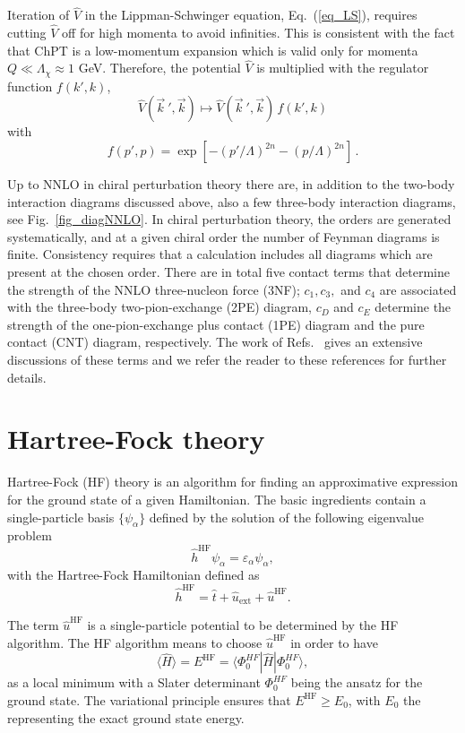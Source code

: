 Iteration of $\widehat V$ in the Lippman-Schwinger equation, Eq.~(\ref{eq_LS}),
requires cutting $\widehat V$ off for high momenta to avoid
infinities.  This is consistent with the fact that ChPT is a
low-momentum expansion which is valid only for momenta $Q \ll
\Lambda_\chi \approx 1$ GeV.  Therefore, the potential $\widehat V$ is
multiplied with the regulator function $f(k',k)$,
\begin{equation}
{\widehat V}(\vec{ k}~',{\vec k}) \longmapsto {\widehat V}(\vec{
  k}~',{\vec k}) \, f(k',k)
\end{equation}
with
\begin{equation}
f(p',p) = \exp[-(p'/\Lambda)^{2n}-(p/\Lambda)^{2n}] \,.
\label{eq:eq_f}
\end{equation}


Up to NNLO in chiral perturbation theory there are, in addition to the
two-body interaction diagrams discussed above, also a few three-body
interaction diagrams, see Fig.~\ref{fig_diagNNLO}. In chiral
perturbation theory, the orders are generated systematically, and at a
given chiral order the number of Feynman diagrams is
finite. Consistency requires that a calculation includes all diagrams
which are present at the chosen order. 
There are in total five contact terms that determine the strength of
the NNLO three-nucleon force (3NF); $c_1,c_3,$ and $c_4$ are
associated with the three-body two-pion-exchange (2PE) diagram, $c_D$
and $c_E$ determine the strength of the one-pion-exchange plus contact
(1PE) diagram and the pure contact (CNT) diagram,
respectively. The work of Refs.~\cite{epelbaum2002,epelbaum2009} 
gives an extensive discussions of these terms and we refer the reader to these references for further details.

\section{Hartree-Fock theory}\label{sec:chap8hf}

Hartree-Fock (HF) theory is an algorithm for finding an approximative
expression for the ground state of a given Hamiltonian. The basic
ingredients contain a single-particle basis $\{\psi_{\alpha}\}$
defined by the solution of the following eigenvalue problem
\[ 
\hat{h}^{\mathrm{HF}}\psi_{\alpha} =\varepsilon_{\alpha}\psi_{\alpha},
\]
with the Hartree-Fock Hamiltonian defined as
\[
\hat{h}^{\mathrm{HF}}=\hat{t}+\hat{u}_{\mathrm{ext}}+\hat{u}^{\mathrm{HF}}.
\]

The term $\hat{u}^{\mathrm{HF}}$ is a single-particle potential to be
determined by the HF algorithm. The HF algorithm means to choose
$\hat{u}^{\mathrm{HF}}$ in order to have
\[ \langle \hat{H} \rangle = E^{\mathrm{HF}}= \langle \Phi_0^{HF} | \hat{H}|\Phi_0^{HF} \rangle,
\]
as a local minimum with a Slater determinant
$\Phi_0^{HF}$ being the ansatz for the ground state.  The variational
principle ensures that $E^{\mathrm{HF}} \ge E_0$, with $E_0$ the representing the exact
ground state energy.

